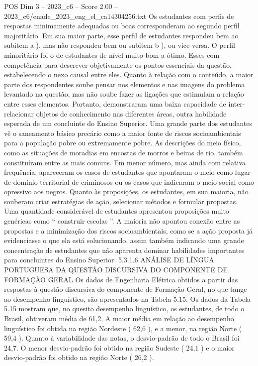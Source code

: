 \begin{textsample}{POS Dim 3 – 2023\_c6 – Score 2.00 – 2023\_c6/enade\_2023\_eng\_el\_ca14304256.txt}
Os estudantes com perfis de respostas minimamente adequadas ou boas corresponderam ao segundo perfil majoritário.
Em sua maior parte, esse perfil de estudantes respondeu bem ao subitem a ), mas não respondeu bem ou subitem b ), ou vice-versa.
O perfil minoritário foi o de estudantes de nível muito bom a ótimo.
Esses com competência para descrever objetivamente os pontos essenciais da questão, estabelecendo o nexo causal entre eles.
Quanto à relação com o conteúdo, a maior parte dos respondentes soube pensar nos elementos e nas imagens do problema levantado na questão, mas não soube fazer as ligações que estimulam a relação entre esses elementos.
Portanto, demonstraram uma baixa capacidade de inter-relacionar objetos de conhecimento nas diferentes áreas, outra habilidade esperada de um concluinte do Ensino Superior.
Uma grande parte dos estudantes vê o saneamento básico precário como a maior fonte de riscos socioambientais para a população pobre ou extremamente pobre.
As descrições do meio físico, como as situações de moradias em encostas de morros e beiras de rio, também constituíram entre as mais comuns.
Em menor número, mas ainda com relativa frequência, apareceram os casos de estudantes que apontaram o meio como lugar de domínio territorial de criminosos ou os casos que indicaram o meio social como opressivo aos negros.
Quanto às proposições, os estudantes, em sua maioria, não souberam criar estratégias de ação, selecionar métodos e formular propostas.
Uma quantidade considerável de estudantes apresentou proposições muito genéricas como “ construir escolas ”.
A maioria não apontou conexão entre as propostas e a minimização dos riscos socioambientais, como se a ação proposta já evidenciasse o que ela está solucionando, assim também indicando uma grande concentração de estudantes que não aparenta dominar habilidades importantes para concluintes do Ensino Superior. 5.3.1.6 ANÁLISE DE LÍNGUA PORTUGUESA DA QUESTÃO DISCURSIVA DO COMPONENTE DE FORMAÇÃO GERAL Os dados de Engenharia Elétrica obtidos a partir das respostas à questão discursiva do componente de Formação Geral, no que tange ao desempenho linguístico, são apresentados na Tabela 5.15.
Os dados da Tabela 5.15 mostram que, no quesito desempenho linguístico, os estudantes, de todo o Brasil, obtiveram média de 61,2.
A maior média em relação ao desempenho linguístico foi obtida na região Nordeste ( 62,6 ), e a menor, na região Norte ( 59,4 ).
Quanto à variabilidade das notas, o desvio-padrão de todo o Brasil foi 24,7.
O menor desvio-padrão foi obtido na região Sudeste ( 24,1 ) e o maior desvio-padrão foi obtido na região Norte ( 26,2 ).

\end{textsample}
